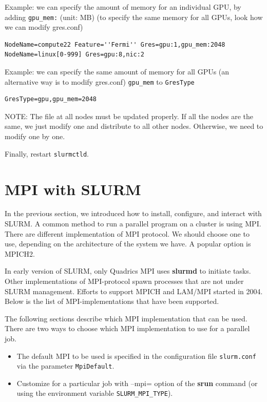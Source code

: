 Example: we can specify the amount of memory for an individual GPU, by adding
\verb!gpu_mem:! (unit: MB) (to specify the same memory for all GPUs, look how
we can modify gres.conf)
\begin{verbatim}
NodeName=compute22 Feature=''Fermi'' Gres=gpu:1,gpu_mem:2048
NodeName=linux[0-999] Gres=gpu:8,nic:2
\end{verbatim}

Example: we can specify the same amount of memory for all GPUs (an alternative
way is to modify gres.conf) \verb!gpu_mem! to \verb!GresType!
\begin{verbatim}
GresType=gpu,gpu_mem=2048
\end{verbatim}

NOTE: The file at all nodes must be updated properly. If all the nodes are the
same, we just modify one and distribute to all other nodes. Otherwise, we need
to modify one by one.



Finally, restart \verb!slurmctld!. 

\section{MPI with SLURM}

In the previous section, we introduced how to install, configure, and interact
with SLURM. A common method to run a parallel program on a cluster is using MPI.
There are different implementation of MPI protocol. We should choose one to use,
depending on the architecture of the system we have. A popular option is MPICH2.

\begin{framed}
In early version of SLURM, only Quadrics MPI uses {\bf slurmd} to initiate
tasks. Other implementations of MPI-protocol spawn processes that are not under
SLURM management. Efforts to support MPICH and LAM/MPI started in 2004. Below is
the list of MPI-implementations that have been supported.
\end{framed}

The following sections describe which MPI implementation that can be used. There
are two ways to choose which MPI implementation to use for a parallel job. 
\begin{itemize}
  \item The default MPI to be used is specified in the configuration file
  \verb!slurm.conf! via the parameter \verb!MpiDefault!. 
  
  \item Customize for a particular job with --mpi= option of the {\bf srun}
  command (or using the environment variable \verb!SLURM_MPI_TYPE!). 
\end{itemize}

